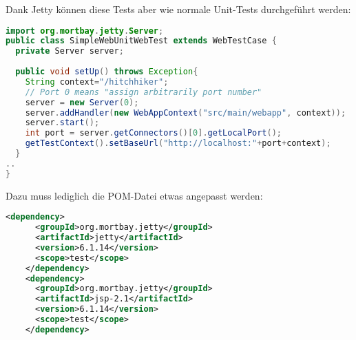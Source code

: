 \newslide
Dank Jetty können diese Tests aber wie normale Unit-Tests durchgeführt
werden:
\begin{lstlisting}[language=java]
import org.mortbay.jetty.Server;
public class SimpleWebUnitWebTest extends WebTestCase {
  private Server server;
	
  public void setUp() throws Exception{
    String context="/hitchhiker";
    // Port 0 means "assign arbitrarily port number"
    server = new Server(0);
    server.addHandler(new WebAppContext("src/main/webapp", context));
    server.start();
    int port = server.getConnectors()[0].getLocalPort();
    getTestContext().setBaseUrl("http://localhost:"+port+context);
  }
..
}
\end{lstlisting}
\newslide
Dazu muss lediglich die POM-Datei etwas angepasst werden:
\begin{lstlisting}[language=xml,
  morekeywords={dependency,groupId,artifactId,version,scope}]
    <dependency>
      <groupId>org.mortbay.jetty</groupId>
      <artifactId>jetty</artifactId>
      <version>6.1.14</version>
      <scope>test</scope>
    </dependency>
    <dependency>
      <groupId>org.mortbay.jetty</groupId>
      <artifactId>jsp-2.1</artifactId>
      <version>6.1.14</version>
      <scope>test</scope>
    </dependency> 
\end{lstlisting}